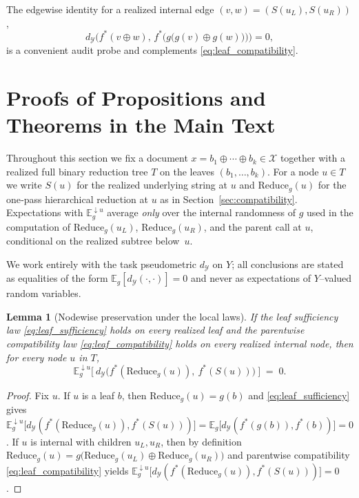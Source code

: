 \documentclass[11pt]{article}
\newtheorem{lemma}{Lemma}
\newcommand{\Strings}{\mathcal{X}}       %
\newcommand{\Y}{\mathcal{Y}}               %
\newcommand{\fstar}{f^*}               %
\newcommand{\E}{\mathbb{E}}
\newcommand{\concat}{\oplus}                    %
\newcommand{\metric}{d_{\Y}}
\newcommand{\reduce}{\text{Reduce}}
\newcommand{\reduceg}{\reduce_g}
\newcommand{\Eg}{\E_g}     %
\begin{document}
The edgewise identity for a realized internal edge $(v,w)=(S(u_L),S(u_R))$,
\[
\metric\!\Big(\fstar(v\concat w),\,\fstar\!\big(g\big(g(v)\concat g(w)\big)\big)\Big)=0,
\]
is a convenient audit probe and complements \ref{eq:leaf_compatibility}.

\section{Proofs of Propositions and Theorems in the Main Text}
\label{app:proofs-core}

Throughout this section we fix a document $x=b_1\concat\cdots\concat b_k\in\Strings$ together with a realized full binary reduction tree $T$ on the leaves $(b_1,\dots,b_k)$. For a node $u\in T$ we write $S(u)$ for the realized underlying string at $u$ and $\reduceg(u)$ for the one‑pass hierarchical reduction at $u$ as in Section~\ref{sec:compatibility}. Expectations with $\Eg^{\downarrow u}$ average \emph{only} over the internal randomness of $g$ used in the computation of $\reduceg(u_L)$, $\reduceg(u_R)$, and the parent call at $u$, conditional on the realized subtree below~$u$.

\medskip\noindent
We work entirely with the task pseudometric $\metric$ on $Y$; all conclusions are stated as equalities of the form $\Eg[\metric(\cdot,\cdot)]=0$ and never as expectations of $Y$–valued random variables.

\begin{lemma}[Nodewise preservation under the local laws]\label{lem:nodewise}
If the leaf sufficiency law \eqref{eq:leaf_sufficiency} holds on every realized leaf and the parentwise compatibility law \eqref{eq:leaf_compatibility} holds on every realized internal node, then for every node $u$ in $T$,
\[
\Eg^{\downarrow u}\!\Big[\ \metric\!\big(\fstar(\reduceg(u)),\ \fstar(S(u))\big)\ \Big]\;=\;0.
\]
\end{lemma}

\begin{proof}
Fix $u$. If $u$ is a leaf $b$, then $\reduceg(u)=g(b)$ and \eqref{eq:leaf_sufficiency} gives
$\Eg^{\downarrow u}\!\big[\metric(\fstar(\reduceg(u)),\fstar(S(u)))\big]
=\Eg\!\big[\metric(\fstar(g(b)),\fstar(b))\big]=0$.
If $u$ is internal with children $u_L,u_R$, then by definition
$\reduceg(u)=g\!\big(\reduceg(u_L)\concat \reduceg(u_R)\big)$
and parentwise compatibility \eqref{eq:leaf_compatibility} yields
$\Eg^{\downarrow u}\!\big[\metric(\fstar(\reduceg(u)),\fstar(S(u)))\big]=0$.
\end{proof}
\end{document}
